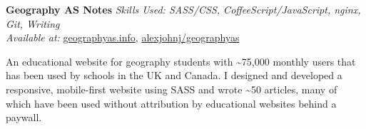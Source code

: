 \textbf{Geography AS Notes}  \newline
\textit{Skills Used: SASS/CSS, CoffeeScript/JavaScript, nginx, Git, Writing}\\
\textit{Available at:} \href{https://geographyas.info}{geographyas.info}, \href{https://github.com/\myweb/geographyas}{alexjohnj/geographyas}

An educational website for geography students with \textasciitilde{}75,000
monthly users that has been used by schools in the UK and Canada. I designed and
developed a responsive, mobile-first website using SASS and wrote
\textasciitilde{}50 articles, many of which have been used without attribution
by educational websites behind a paywall.

